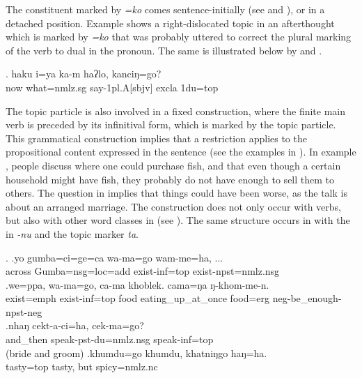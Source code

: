 The constituent marked by \emph{=ko} comes sentence-initially (see \LLast and \Last), or in a detached position. Example \Next shows a right-dislocated topic in an afterthought which is marked by \emph{=ko} that was probably uttered to correct the plural marking of the verb to dual in the pronoun. The same is illustrated below by \NNext[b] and \NNext[c].

\exg.  haku i=ya  ka-m  haʔlo, kanciŋ=go?\\
	now what{\sc =nmlz.sg} say{\sc -1pl.A[sbjv]} {\sc excla} {\sc 1du=top} \\
	 		

	
The topic particle is also involved in a fixed construction, where the finite main verb is preceded by its infinitival form, which is marked by the topic particle. This grammatical construction implies that a restriction applies to the propositional content expressed in the sentence  (see the examples in \Next). In example \Next[a], people discuss where one could purchase fish, and that even though a certain household might have fish, they probably do not have enough to sell them to others. The question in \Next[c] implies that things could have been worse, as the talk is about an arranged marriage. The construction does not only occur with verbs, but also with other word classes in  (see \Next[d]). The same structure occurs in  with the  in \emph{-nu} and the topic marker \emph{ta}. 

\ex. \ag.yo    gumba=ci=ge=ca  wa-ma=go  wam-me=ha, ... \\
across Gumba{\sc =nsg=loc=add} exist{\sc -inf=top} exist{\sc [3sg]-npst=nmlz.nsg}\\
 
\bg.we=ppa,             wa-ma=go,          ca-ma khoblek. cama=ŋa   ŋ-khom-me-n.\\
exist{\sc [3sg;npst]=emph} exist{\sc -inf=top} food eating\_up\_at\_once food{\sc =erg} {\sc neg-}be\_enough{\sc [1.P]-npst-neg}\\
 
\bg.nhaŋ    cekt-a-ci=ha,                cek-ma=go?\\
and\_then speak{\sc -pst-du=nmlz.nsg} speak{\sc -inf=top}\\
 (bride and groom) 
\bg.khumdu=go khumdu, khatniŋgo haŋ=ha.\\
tasty{\sc =top} tasty, but spicy{\sc =nmlz.nc} \\



